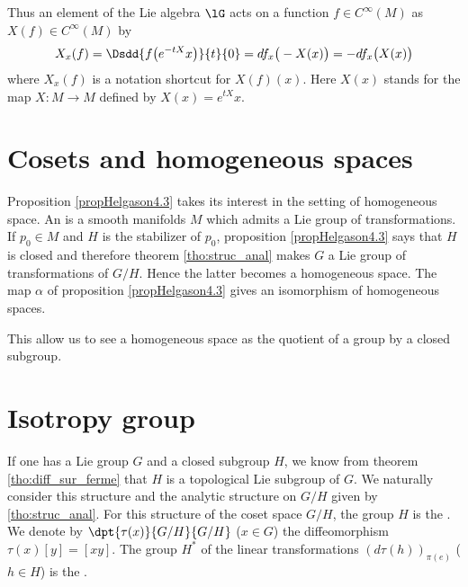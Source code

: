Thus an element of the Lie algebra \( \lG\) acts on a function \( f\in C^{\infty}(M)\) as \( X(f)\in C^{\infty}(M)\) by
\begin{equation}        \label{EQooQDLAooZXnWta}
    X_x(f)=\Dsdd{ f\big(  e^{-tX}x \big) }{t}{0}=df_x\big( -X(x) \big)=-df_x\big( X(x) \big)
\end{equation}
where \( X_x(f)\) is a notation shortcut for \( X(f)(x)\). Here \( X(x)\) stands for the map \( X\colon M\to M\) defined by \( X(x)= e^{tX}x\).

\section{Cosets and homogeneous spaces}

Proposition \ref{propHelgason4.3} takes its interest in the setting of homogeneous space. An  is a smooth manifolds $M$ which admits a Lie group of transformations. If $p_{0}\in M$ and $H$ is the stabilizer of $p_{0}$, proposition \ref{propHelgason4.3} says that $H$ is closed and therefore theorem \ref{tho:struc_anal} makes $G$ a Lie group of transformations of $G/H$. Hence the latter becomes a homogeneous space. The map $\alpha$ of proposition \ref{propHelgason4.3} gives an isomorphism of homogeneous spaces. 

This allow us to see a homogeneous space as the quotient of a group by a closed subgroup.

\section{Isotropy group}

If one has a Lie group $G$ and a closed subgroup $H$, we know from theorem \ref{tho:diff_sur_ferme} that $H$ is a topological Lie subgroup of $G$. We naturally consider this structure and the analytic structure on $G/H$ given by \ref{tho:struc_anal}. For this structure of the coset space $G/H$, the group $H$ is the . We denote by $\dpt{\tau(x)}{G/H}{G/H}$ ($x\in G$) the diffeomorphism $\tau(x)[y]=[xy]$. The group $H^*$ of the linear transformations $(d\tau(h))_{\pi(e)}$ ($h\in H$) is the .


